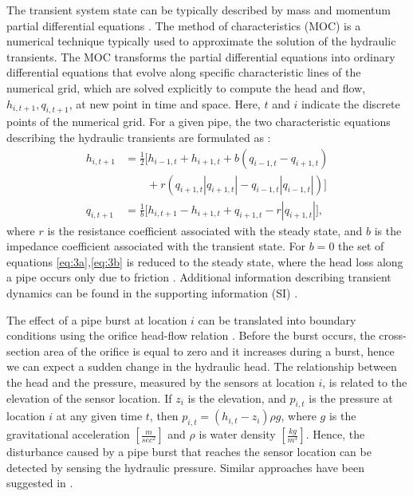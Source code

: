 \documentclass[twocolumn]{autart}
\begin{document}
The transient system state can be typically described by mass and momentum partial differential equations \cite{wylie1993fluid}.
The method of characteristics (MOC) is a numerical technique typically used to approximate the solution of the hydraulic transients. The MOC transforms the partial differential equations into ordinary differential equations that evolve along specific characteristic lines of the numerical grid, which are solved explicitly to compute the head and flow, $h_{i,t+1},q_{i,t+1}$, at new point in time and space. Here, $t$ and $i$ indicate the discrete points of the numerical grid. For a given pipe, the two characteristic equations describing the hydraulic transients are formulated as \cite{Dalius}:
\begin{align} 
 h_{i,t+1} &= \frac{1}{2} \big[ h_{i-1,t} + h_{i+1,t} + b \left( q_{i-1,t} - q_{i+1,t} \right) \nonumber \\
 &\qquad {} + r \left( q_{i+1,t} |q_{i+1,t}| - q_{i-1,t} |q_{i-1,t}| \right) \big] \label{eq:3a}\\
q_{i,t+1} &= \frac{1}{b} \big[ h_{i,t+1} -h_{i+1,t} + q_{i+1,t} - r |q_{i+1,t}| \big],  \label{eq:3b}
\end{align} 
where $r$ is the resistance coefficient associated with the steady state, and $b$ is the impedance coefficient associated with the transient state. For $b = 0$ the set of equations \eqref{eq:3a},\eqref{eq:3b} is reduced to the steady state, where the head loss along a pipe occurs only due to friction \cite{todini}. Additional information describing transient dynamics can be found in the supporting information (SI) \cite{perelman2015}. \vspace{-0.25cm} 

The effect of a pipe burst at location $i$ can be translated into boundary conditions using the orifice head-flow relation \cite{wylie1993fluid}. Before the burst occurs, the cross-section area of the orifice is equal to zero and it increases during a burst, hence we can expect a sudden change in the hydraulic head. The relationship between the head and the pressure, measured by the sensors at location $i$, is related to the elevation of the sensor location. If $z_i$ is the elevation, and $p_{i,t}$ is the pressure at location $i$ at any given time $t$, then
$p_{i,t} = \left( h_{i,t} - z_i \right)\rho g$, 
where $g$ is the gravitational acceleration $[\frac{m}{sec^2}]$ and $\rho$ is water density $[\frac{kg}{m^3}]$.  
Hence, the disturbance caused by a pipe burst that reaches the sensor location can be detected by sensing the hydraulic pressure. Similar approaches have been suggested in \cite{6901220}.  \vspace{-0.25cm}
\end{document}
